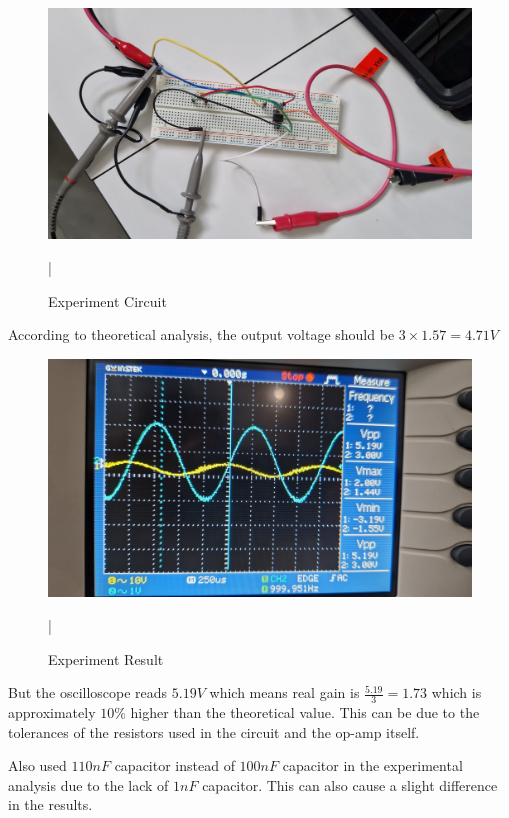 \begin{figure}[h]
    \centering
    \includegraphics[width=1\textwidth]{assets/p1-2-circuit.png}
    \caption{Experiment Circuit}
    \label{fig:p1-2-circuit}
|\end{figure}

According to theoretical analysis, the output voltage should be $3\times 1.57 = 4.71V$

\newpage
\thispagestyle{plain}

\begin{figure}[h]
    \centering
    \includegraphics[width=1\textwidth]{assets/p1-result-experimet-ossiloscope.png}
    \caption{Experiment Result}
    \label{fig:p1-experiment-result}
|\end{figure}

But the oscilloscope reads $5.19V$ which means real gain is $\frac{5.19}{3} = 1.73$ which is approximately $10\%$ higher than the theoretical value. This can be due to the tolerances of the resistors used in the circuit and the op-amp itself.

Also used $110nF$ capacitor instead of $100nF$ capacitor in the experimental analysis due to the lack of $1nF$ capacitor. This can also cause a slight difference in the results.

